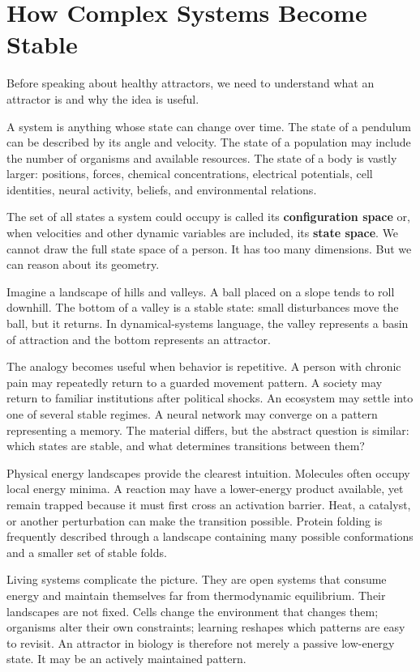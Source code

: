 \chapter{How Complex Systems Become Stable}\label{chapter-2-how-complex-systems-become-stable}

Before speaking about healthy attractors, we need to understand what an attractor is and why the idea is useful.

A system is anything whose state can change over time. The state of a pendulum can be described by its angle and velocity. The state of a population may include the number of organisms and available resources. The state of a body is vastly larger: positions, forces, chemical concentrations, electrical potentials, cell identities, neural activity, beliefs, and environmental relations.

The set of all states a system could occupy is called its \textbf{configuration space} or, when velocities and other dynamic variables are included, its \textbf{state space}. We cannot draw the full state space of a person. It has too many dimensions. But we can reason about its geometry.

Imagine a landscape of hills and valleys. A ball placed on a slope tends to roll downhill. The bottom of a valley is a stable state: small disturbances move the ball, but it returns. In dynamical-systems language, the valley represents a basin of attraction and the bottom represents an attractor.

The analogy becomes useful when behavior is repetitive. A person with chronic pain may repeatedly return to a guarded movement pattern. A society may return to familiar institutions after political shocks. An ecosystem may settle into one of several stable regimes. A neural network may converge on a pattern representing a memory. The material differs, but the abstract question is similar: which states are stable, and what determines transitions between them?

Physical energy landscapes provide the clearest intuition. Molecules often occupy local energy minima. A reaction may have a lower-energy product available, yet remain trapped because it must first cross an activation barrier. Heat, a catalyst, or another perturbation can make the transition possible. Protein folding is frequently described through a landscape containing many possible conformations and a smaller set of stable folds.

Living systems complicate the picture. They are open systems that consume energy and maintain themselves far from thermodynamic equilibrium. Their landscapes are not fixed. Cells change the environment that changes them; organisms alter their own constraints; learning reshapes which patterns are easy to revisit. An attractor in biology is therefore not merely a passive low-energy state. It may be an actively maintained pattern.

